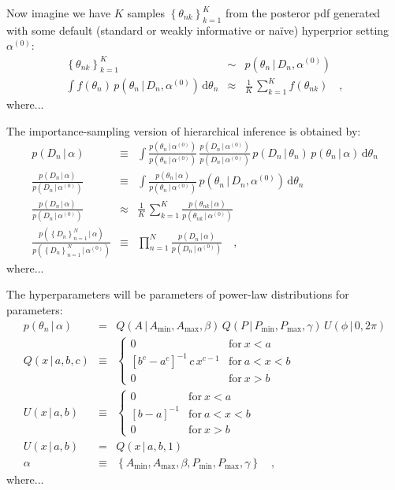 \documentclass[12pt]{article}
\newcommand{\given}{\,|\,}
\newcommand{\dd}{\mathrm{d}}
\newcommand{\pdf}{p}
\newcommand{\setof}[1]{\left\{{#1}\right\}}
\newcommand{\data}{D_n}
\newcommand{\setofalldata}{\setof{\data}_{n=1}^N}
\newcommand{\parsymbol}{\theta}
\newcommand{\pars}{\parsymbol_n}
\newcommand{\hyperpars}{\alpha}
\newcommand{\sample}{\parsymbol_{nk}}
\newcommand{\default}[1]{{#1}^{(0)}}
\newcommand{\setofallsamples}{\setof{\sample}_{k=1}^K}
\newcommand{\amp}{A}
\newcommand{\period}{P}
\newcommand{\phase}{\phi}
\newcommand{\ampmin}{\amp_{\min}}
\newcommand{\ampmax}{\amp_{\max}}
\newcommand{\amppower}{\beta}
\newcommand{\periodmin}{\period_{\min}}
\newcommand{\periodmax}{\period_{\max}}
\newcommand{\periodpower}{\gamma}
\newcommand{\powerlaw}{Q}
\newcommand{\uniform}{U}
\begin{document}
Now imagine we have $K$ samples $\setofallsamples$ from the
posteror pdf generated with some default (standard or weakly
informative or na\"ive) hyperprior setting $\default{\hyperpars}$:
\begin{eqnarray}
\setofallsamples
 &\sim&
\pdf(\pars\given\data,\default{\hyperpars})
\\
\int f(\pars)\,\pdf(\pars\given\data,\default{\hyperpars})\,\dd\pars
 &\approx&
\frac{1}{K}\,\sum_{k=1}^K f(\sample)
\quad,
\end{eqnarray}
where...

The importance-sampling version of hierarchical inference is
obtained by:
\begin{eqnarray}
\pdf(\data\given\hyperpars)
 &\equiv&
\int \frac{\pdf(\pars\given\default{\hyperpars})}{\pdf(\pars\given\default{\hyperpars})}\,\frac{\pdf(\data\given\default{\hyperpars})}{\pdf(\data\given\default{\hyperpars})}\,\pdf(\data\given\pars)\,\pdf(\pars\given\hyperpars)\,\dd\pars
\\
\frac{\pdf(\data\given\hyperpars)}{\pdf(\data\given\default{\hyperpars})} 
 &\equiv&
\int \frac{\pdf(\pars\given\hyperpars)}{\pdf(\pars\given\default{\hyperpars})}\,\pdf(\pars\given\data,\default{\hyperpars})\,\dd\pars
\\
\frac{\pdf(\data\given\hyperpars)}{\pdf(\data\given\default{\hyperpars})} 
 &\approx&
\frac{1}{K}\,\sum_{k=1}^K \frac{\pdf(\sample\given\hyperpars)}{\pdf(\sample\given\default{\hyperpars})}
\\
\frac{\pdf(\setofalldata\given\hyperpars)}{\pdf(\setofalldata\given\default{\hyperpars})} &\equiv& \prod_{n=1}^N \frac{\pdf(\data\given\hyperpars)}{\pdf(\data\given\default{\hyperpars})}
\quad,
\end{eqnarray}
where...

The hyperparameters will be parameters of power-law distributions for
parameters:
\begin{eqnarray}
\pdf(\pars\given\hyperpars)
  &=&
\powerlaw(\amp\given\ampmin,\ampmax,\amppower)\,\powerlaw(\period\given\periodmin,\periodmax,\periodpower)\,\uniform(\phase\given 0,2\pi)
\\
\powerlaw(x\given a,b,c)
  &\equiv&
\left\{\begin{array}{cl}
  0 & \mbox{for}~x < a \\
  {[b^c - a^c]}^{-1}\,c\,x^{c-1} & \mbox{for}~a < x < b \\
  0 & \mbox{for}~x > b
\end{array}\right.
\\
\uniform(x\given a,b)
  &\equiv&
\left\{\begin{array}{cl}
  0 & \mbox{for}~x < a \\
  {[b - a]}^{-1} & \mbox{for}~a < x < b \\
  0 & \mbox{for}~x > b
\end{array}\right.
\\
\uniform(x\given a,b)
  &=& \powerlaw(x\given a,b,1)
\\
\hyperpars
  &\equiv&
\setof{\ampmin, \ampmax, \amppower, \periodmin, \periodmax, \periodpower}
\quad,
\end{eqnarray}
where...
\end{document}
